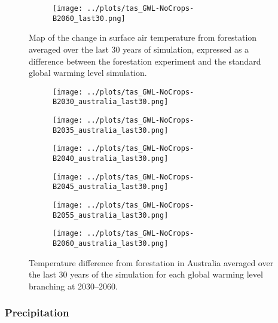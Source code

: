 \documentclass[]{article}
\begin{document}
\begin{figure}[H]
    \centering
    \begin{subfigure}[b]{\linewidth}
        \texttt{[image: ../plots/tas\_GWL-NoCrops-B2060\_last30.png]}
    \end{subfigure}
    \caption{Map of the change in surface air temperature from forestation averaged over the last 30 years of simulation, expressed as a difference between the forestation experiment and the standard global warming level simulation.}
    \label{fig:temperature_map}
\end{figure}

\begin{figure}[H]
    \centering
    \begin{subfigure}[b]{0.4\linewidth}
        \texttt{[image: ../plots/tas\_GWL-NoCrops-B2030\_australia\_last30.png]}
    \end{subfigure}
    \begin{subfigure}[b]{0.4\linewidth}
        \texttt{[image: ../plots/tas\_GWL-NoCrops-B2035\_australia\_last30.png]}
    \end{subfigure}
    \begin{subfigure}[b]{0.4\linewidth}
        \texttt{[image: ../plots/tas\_GWL-NoCrops-B2040\_australia\_last30.png]}
    \end{subfigure}
    \begin{subfigure}[b]{0.4\linewidth}
        \texttt{[image: ../plots/tas\_GWL-NoCrops-B2045\_australia\_last30.png]}
    \end{subfigure}
    \begin{subfigure}[b]{0.4\linewidth}
        \texttt{[image: ../plots/tas\_GWL-NoCrops-B2055\_australia\_last30.png]}
    \end{subfigure}
    \begin{subfigure}[b]{0.4\linewidth}
        \texttt{[image: ../plots/tas\_GWL-NoCrops-B2060\_australia\_last30.png]}
    \end{subfigure}
    \caption{Temperature difference from forestation in Australia averaged over the last 30 years of the simulation for each global warming level branching at 2030–2060.}
    \label{fig:tas_australia}
\end{figure}

\subsubsection{Precipitation}
\end{document}
